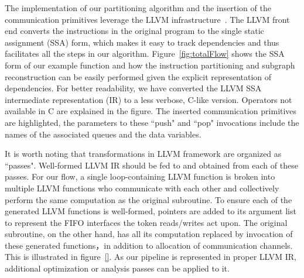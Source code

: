 The implementation of our partitioning algorithm and the insertion of the communication primitives leverage the LLVM infrastructure~\cite{llvmflow}. The LLVM front end converts the instructions in the original program to the single static assignment (SSA) form, which makes it easy to track dependencies and thus facilitates all the steps in our algorithm. Figure~\ref{fig:totalFlow} shows the SSA form
of our example function and how the instruction partitioning and subgraph reconstruction can be easily performed given the explicit representation of
dependencies. For better readability, we have converted the LLVM SSA intermediate representation (IR) to a less verbose, C-like version. Operators not available in C are explained in the figure. The inserted communication primitives are highlighted,
the parameters to these ``push" and ``pop" invocations include the names of the associated queues and the data variables.


It is worth noting that transformations in LLVM framework are organized as ``passes". Well-formed LLVM IR should be fed to and obtained from each of these passes. For our flow, a single loop-containing LLVM function is broken into multiple LLVM functions who communicate with each other and collectively perform the same computation as the original subroutine. To ensure each of the generated
 LLVM functions is well-formed, pointers are added to its argument list to represent the FIFO interfaces the token reads/writes act upon. The original subroutine, on the other hand, has all its computation replaced by invocation of these generated functions，in addition to allocation of communication channels. This is illustrated in figure~\ref{}.
 As our pipeline is represented in proper LLVM IR, additional optimization or analysis passes can be applied to it.
 

